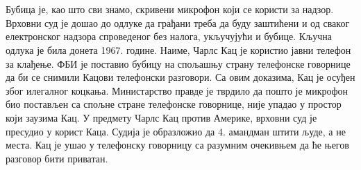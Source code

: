 \documentclass{article}
\begin{document}
\\\\
Бубица је, као што сви знамо, скривени микрофон који се користи за надзор. Врховни суд је дошао до одлуке да грађани треба да буду заштићени и од сваког електронског надзора спроведеног без налога, укључујући и бубице. Кључна одлука је била донета 1967. године. Наиме, Чарлс Кац је користио јавни телефон за клађење. ФБИ је поставио бубицу на спољашњу страну телефонске говорнице да би се снимили Кацови телефонски разговори. Са овим доказима, Кац је осуђен због илегалног коцкања. Министарство правде је тврдило да пошто је микрофон био постављен са спољне стране телефонске говорнице, није упадао у простор који заузима Кац. У предмету Чарлс Кац против Америке, врховни суд је пресудио у корист Каца. Судија је образложио да 4. амандман штити људе, а не места. Кац је ушао у телефонску говорницу са разумним очекивњем да ће његов разговор бити приватан.
 
\end{document}
